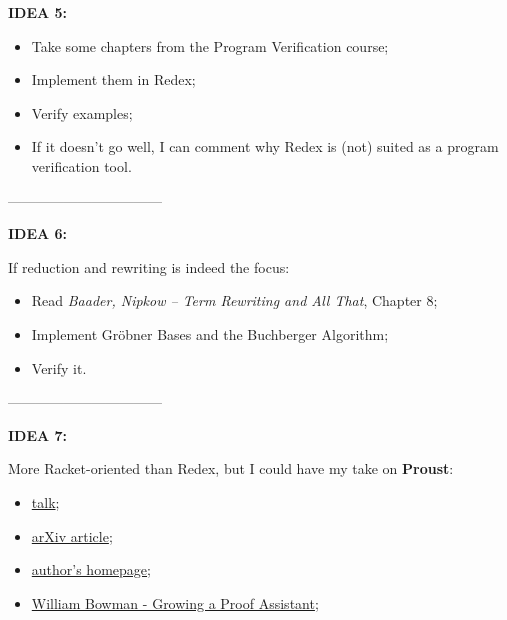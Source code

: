 {  \textbf{IDEA 5:}
  \begin{itemize}
  \item Take some chapters from the Program Verification course;
  \item Implement them in Redex;
  \item Verify examples;
  \item If it doesn't go well, I can comment why Redex is (not) suited as
    a program verification tool.
  \end{itemize}


  ---------------------------------

  \textbf{IDEA 6:}

  If reduction and rewriting is indeed the focus:
  \begin{itemize}
  \item Read \emph{Baader, Nipkow -- Term Rewriting and All That}, Chapter 8;
  \item Implement Gr\"obner Bases and the Buchberger Algorithm;
  \item Verify it.
  \end{itemize}

  ---------------------------------

  \textbf{IDEA 7:}

  More Racket-oriented than Redex, but I could have my take on
  \textbf{Proust}:
  \begin{itemize}
  \item \href{https://www.youtube.com/watch?v=jimmGDcTx4Y}{talk};
  \item \href{https://arxiv.org/abs/1611.09473}{arXiv article};
  \item \href{https://cs.uwaterloo.ca/~plragde/}{author's homepage};
  \item \href{https://www.williamjbowman.com/resources/cur.pdf}{William Bowman - Growing a Proof Assistant};
  \end{itemize}
  
}

